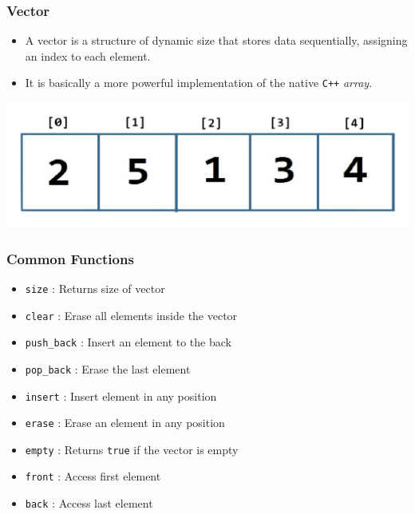 \documentclass{beamer}
\begin{document}
\begin{frame}
    \frametitle{Vector}

    \begin{itemize}
        \item A vector is a structure of dynamic size that stores data sequentially, assigning an index to each element.
        \item It is basically a more powerful implementation of the native \texttt{C++} \textit{array}.
    \end{itemize}

    \begin{center}
        \includegraphics[scale=0.25]{images/vector}
    \end{center}
\end{frame}

\begin{frame}
    \frametitle{Common Functions}

    \begin{itemize}
        \item \texttt{size} : Returns size of vector
        \item \texttt{clear} : Erase all elements inside the vector
        \item \texttt{push\_back} : Insert an element to the back
        \item \texttt{pop\_back} : Erase the last element
        \item \texttt{insert} : Insert element in any position
        \item \texttt{erase} : Erase an element in any position
        \item \texttt{empty} : Returns \texttt{true} if the vector is empty
        \item \texttt{front} : Access first element
        \item \texttt{back} : Access last element
    \end{itemize}
\end{frame}
\end{document}
